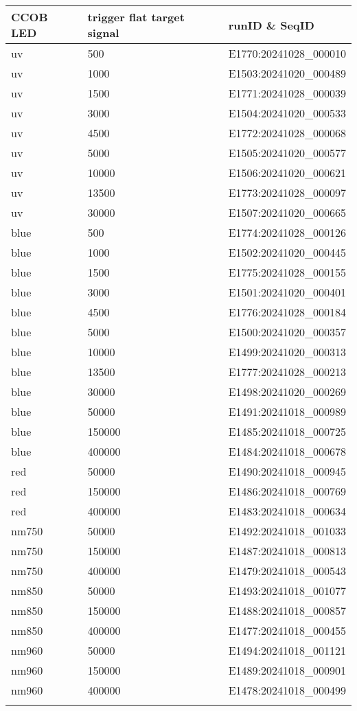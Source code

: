 \begin{center}
\begin{longtable}{lll}
\hline \hline
\endlastfoot
\midrule\noalign{}
CCOB LED & trigger flat target signal & runID \& SeqID \\
\midrule\noalign{}
uv &   500 & E1770:20241028\_000010 \\
uv &  1000 & E1503:20241020\_000489 \\
uv &  1500 & E1771:20241028\_000039 \\
uv &  3000 & E1504:20241020\_000533 \\
uv &  4500 & E1772:20241028\_000068 \\
uv &  5000 & E1505:20241020\_000577 \\
uv & 10000 & E1506:20241020\_000621 \\
uv & 13500 & E1773:20241028\_000097 \\
uv & 30000 & E1507:20241020\_000665 \\
\midrule\noalign{}
blue &   500 & E1774:20241028\_000126 \\
blue &  1000 & E1502:20241020\_000445 \\
blue &  1500 & E1775:20241028\_000155 \\
blue &  3000 & E1501:20241020\_000401 \\
blue &  4500 & E1776:20241028\_000184 \\
blue &  5000 & E1500:20241020\_000357 \\
blue & 10000 & E1499:20241020\_000313 \\
blue & 13500 & E1777:20241028\_000213 \\
blue & 30000 & E1498:20241020\_000269 \\
blue & 50000 & E1491:20241018\_000989 \\
blue &150000 & E1485:20241018\_000725 \\
blue &400000 & E1484:20241018\_000678 \\
\midrule\noalign{}
red & 50000 & E1490:20241018\_000945 \\
red &150000 & E1486:20241018\_000769 \\
red &400000 & E1483:20241018\_000634 \\
\midrule\noalign{}
nm750 & 50000 & E1492:20241018\_001033 \\
nm750 &150000 & E1487:20241018\_000813 \\
nm750 &400000 & E1479:20241018\_000543 \\
\midrule\noalign{}
nm850 & 50000 & E1493:20241018\_001077 \\
nm850 &150000 & E1488:20241018\_000857 \\
nm850 &400000 & E1477:20241018\_000455 \\
\midrule\noalign{}
nm960 & 50000 & E1494:20241018\_001121 \\
nm960 &150000 & E1489:20241018\_000901 \\
nm960 &400000 & E1478:20241018\_000499 \\
\bottomrule\noalign{}
\end{longtable}
\end{center}
